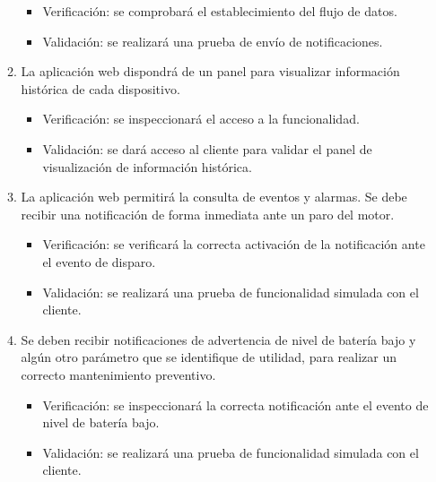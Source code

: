 \documentclass[
11pt, %
]{charter}
\begin{document}
\begin{enumerate}
\begin{enumerate}
			\begin{itemize}
				\item Verificación: se comprobará el establecimiento del flujo de datos.
				\item Validación: se realizará una prueba de envío de notificaciones.
			\end{itemize}
			\item La aplicación web dispondrá de un panel para visualizar información histórica de cada dispositivo.
			\begin{itemize}
				\item Verificación: se inspeccionará el acceso a la funcionalidad.
				\item Validación: se dará acceso al cliente para validar el panel de visualización de información histórica. 
			\end{itemize}
			\item La aplicación web permitirá la consulta de eventos y alarmas. Se debe recibir una notificación de forma inmediata ante un paro del motor.
			\begin{itemize}
				\item Verificación: se verificará la correcta activación de la notificación ante el evento de disparo.
				\item Validación: se realizará una prueba de funcionalidad simulada con el cliente.
			\end{itemize}
			\item Se deben recibir notificaciones de advertencia de nivel de batería bajo y algún otro parámetro que se identifique de utilidad, para realizar un correcto mantenimiento preventivo.
			\begin{itemize}
				\item Verificación: se inspeccionará la correcta notificación ante el evento de nivel de batería bajo.
				\item Validación: se realizará una prueba de funcionalidad simulada con el cliente.
			\end{itemize}
		\end{enumerate}


\end{enumerate}
\end{document}
